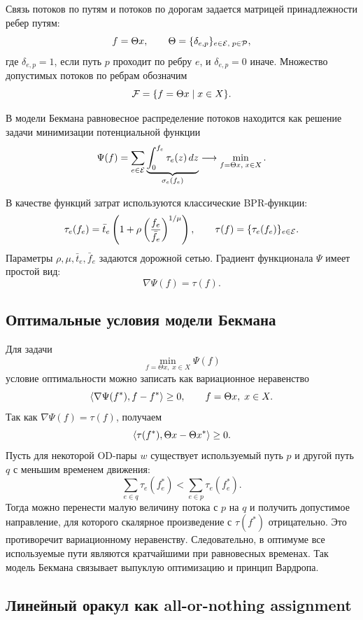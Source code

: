 Связь потоков по путям и потоков по дорогам задается матрицей принадлежности ребер путям:
\[
    f=\Theta x,
    \qquad
    \Theta=\{\delta_{e,p}\}_{e\in\mathcal{E},\;p\in\mathcal{P}},
\]
где $\delta_{e,p}=1$, если путь $p$ проходит по ребру $e$, и $\delta_{e,p}=0$ иначе.
Множество допустимых потоков по ребрам обозначим
\[
    \mathcal{F}=\{f=\Theta x\mid x\in X\}.
\]

В модели Бекмана равновесное распределение потоков находится как решение задачи минимизации
потенциальной функции
\begin{equation}
    \Psi(f) =
    \sum_{e \in \mathcal{E}}
    \underbrace{\int_{0}^{f_e} \tau_e(z)\,dz}_{\sigma_e(f_e)}
    \longrightarrow
    \min_{f=\Theta x,\;x\in X}.
    \label{eq:beckmann-primal}
\end{equation}

В качестве функций затрат используются классические BPR-функции:
\begin{equation}
    \tau_e(f_e)=
    \bar t_e
    \left(
        1+\rho\left(\frac{f_e}{\bar f_e}\right)^{1/\mu}
    \right),
    \qquad
    \tau(f)=\{\tau_e(f_e)\}_{e\in\mathcal{E}}.
    \label{eq:bpr}
\end{equation}
Параметры $\rho,\mu,\bar t_e,\bar f_e$ задаются дорожной сетью.
Градиент функционала $\Psi$ имеет простой вид:
\[
    \nabla \Psi(f)=\tau(f).
\]

\subsection{Оптимальные условия модели Бекмана}
\label{subsec:beckmann-optimality}

Для задачи
\[
    \min_{f=\Theta x,\;x\in X}\Psi(f)
\]
условие оптимальности можно записать как вариационное неравенство
\[
    \left\langle \nabla\Psi(f^\ast), f-f^\ast \right\rangle\geq 0,
    \qquad f=\Theta x,\;x\in X.
\]
Так как $\nabla\Psi(f)=\tau(f)$, получаем
\[
    \left\langle \tau(f^\ast), \Theta x-\Theta x^\ast \right\rangle\geq 0.
\]
Пусть для некоторой OD-пары $w$ существует используемый путь $p$ и другой путь $q$ с
меньшим временем движения:
\[
    \sum_{e\in q}\tau_e(f^\ast_e)
    <
    \sum_{e\in p}\tau_e(f^\ast_e).
\]
Тогда можно перенести малую величину потока с $p$ на $q$ и получить допустимое направление,
для которого скалярное произведение с $\tau(f^\ast)$ отрицательно.
Это противоречит вариационному неравенству.
Следовательно, в оптимуме все используемые пути являются кратчайшими при равновесных временах.
Так модель Бекмана связывает выпуклую оптимизацию и принцип Вардропа.

\subsection{Линейный оракул как all-or-nothing assignment}
\label{subsec:fw-lmo-aon}

